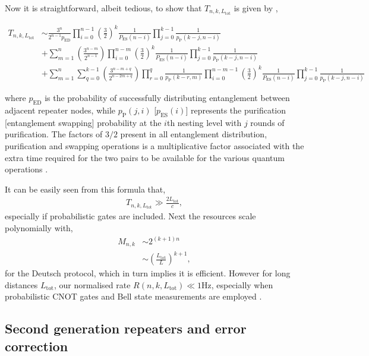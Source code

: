 \documentclass[twocolumn, aps, rmp, amsmath, amssymb, nofootinbib, superscriptaddress, longbibliography, floatfix, table-of-contents, eqsecnum]{revtex4-1}
\begin{document}
Now it is straightforward, albeit tedious, to show that $T_{n,k,L_\mathrm{tot}}$ is given by \cite{bib:braztzik2013},
\begin{widetext}
\begin{align*}
 T_{n,k,L_\mathrm{tot}} &\sim \frac{3^n}{2^{n-1} p_\mathrm{ED}} \prod_{i=0}^{n-1} \left(\frac{3}{2}\right)^{k}  \frac{1}{P_\mathrm{ES}(n-i)  }\prod_{j=0}^{k-1} \frac{1}{p_\mathrm{P}(k-j,n-i)}  \nonumber \\
 &+\sum_{m=1}^n\left(\frac{3^{n-m}}{2^{n-1}}\right) \prod_{i=0}^{n-m}   \left(\frac{3}{2}\right)^{k} \frac{1}{P_\mathrm{ES}(n-i)}  \prod_{j=0}^{k-1}  \frac{1}{p_\mathrm{P}(k-j,n-i)}  \\
&+\sum_{m=1}^n {\sum_{q=0}^{k-1} \left(\frac{3^{n-m+q}}{2^{n- 2 m+q}}\right) \prod_{r=0}^{q}\frac{1}{p_\mathrm{P}(k-r,m)}} 
\prod_{i=0}^{n-m-1}   \left(\frac{3}{2}\right)^{k} \frac{1}{P_\mathrm{ES}(n-i)}  \prod_{j=0}^{k-1}  \frac{1}{p_\mathrm{P}(k-j,n-i)} \nonumber 
\end{align*}
\end{widetext}
where $p_\mathrm{ED}$ is the probability of successfully distributing entanglement between adjacent repeater nodes, while $p_\mathrm{P}(j,i)$ [$p_\mathrm{ES}(i)$] represents the purification [entanglement swapping] probability at the $i$th nesting level with $j$ rounds of purification. The factors of $3/2$ present in all entanglement distribution,  purification and swapping operations is a multiplicative factor associated with the extra time required for the two pairs to be available for the various quantum operations \cite{bib:SSRG09}.

It can be easily seen from this formula that,
\begin{align}
	T_{n,k,L_\mathrm{tot}} \gg \frac{2 L_\mathrm{tot}}{c},
\end{align}
especially if probabilistic gates are included. Next the resources scale polynomially with,
\begin{align}
	M_{n,k} &\sim 2^{(k+1)n}\nonumber\\
	&\sim \left(\frac{L_\mathrm{tot}}{L}\right)^{k+1},
\end{align}
for the Deutsch protocol, which in turn implies it is efficient. However for long distances $L_\mathrm{tot}$, our normalised rate \mbox{$R(n,k,L_\mathrm{tot})\ll 1\mathrm{Hz}$}, especially when probabilistic CNOT gates and Bell state measurements are employed \cite{bib:jiang09, munro10}.

\subsection{Second generation repeaters and error correction}
\end{document}
